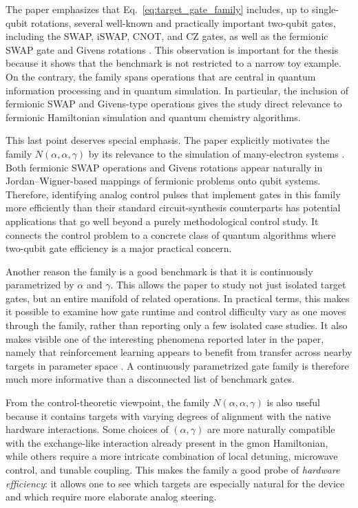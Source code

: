 The paper emphasizes that Eq.~\eqref{eq:target_gate_family} includes, up to single-qubit rotations, several well-known and practically important two-qubit gates, including the SWAP, iSWAP, CNOT, and CZ gates, as well as the fermionic SWAP gate and Givens rotations \cite{Niu2019}. This observation is important for the thesis because it shows that the benchmark is not restricted to a narrow toy example. On the contrary, the family spans operations that are central in quantum information processing and in quantum simulation. In particular, the inclusion of fermionic SWAP and Givens-type operations gives the study direct relevance to fermionic Hamiltonian simulation and quantum chemistry algorithms.

This last point deserves special emphasis. The paper explicitly motivates the family \(N(\alpha,\alpha,\gamma)\) by its relevance to the simulation of many-electron systems \cite{Niu2019}. Both fermionic SWAP operations and Givens rotations appear naturally in Jordan--Wigner-based mappings of fermionic problems onto qubit systems. Therefore, identifying analog control pulses that implement gates in this family more efficiently than their standard circuit-synthesis counterparts has potential applications that go well beyond a purely methodological control study. It connects the control problem to a concrete class of quantum algorithms where two-qubit gate efficiency is a major practical concern.

Another reason the family is a good benchmark is that it is continuously parametrized by \(\alpha\) and \(\gamma\). This allows the paper to study not just isolated target gates, but an entire manifold of related operations. In practical terms, this makes it possible to examine how gate runtime and control difficulty vary as one moves through the family, rather than reporting only a few isolated case studies. It also makes visible one of the interesting phenomena reported later in the paper, namely that reinforcement learning appears to benefit from transfer across nearby targets in parameter space \cite{Niu2019}. A continuously parametrized gate family is therefore much more informative than a disconnected list of benchmark gates.

From the control-theoretic viewpoint, the family \(N(\alpha,\alpha,\gamma)\) is also useful because it contains targets with varying degrees of alignment with the native hardware interactions. Some choices of \((\alpha,\gamma)\) are more naturally compatible with the exchange-like interaction already present in the gmon Hamiltonian, while others require a more intricate combination of local detuning, microwave control, and tunable coupling. This makes the family a good probe of \emph{hardware efficiency}: it allows one to see which targets are especially natural for the device and which require more elaborate analog steering.

